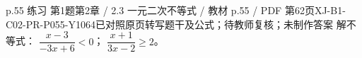 \par\noindent\begin{minipage}{\linewidth}
\begin{bankitem}{p.55 练习 第1题}{第2章 / 2.3 一元二次不等式 / 教材 p.55 / PDF 第62页}{XJ-B1-C02-PR-P055-Y1064}{已对照原页转写题干及公式；待教师复核；未制作答案}
解不等式：
$\dfrac{x-3}{-3x+6}<0$；
$\dfrac{x+1}{3x-2}\ge2$。
\end{bankitem}
\end{minipage}\par\medskip
